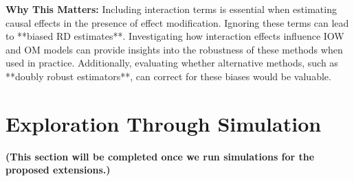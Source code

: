 \documentclass[12pt, oneside]{amsart}
\theoremstyle{definition}
\theoremstyle{remark}
\numberwithin{equation}{section}
\begin{document}
\textbf{Why This Matters:} Including interaction terms is essential when estimating causal effects in the presence of effect modification. Ignoring these terms can lead to **biased RD estimates**. Investigating how interaction effects influence IOW and OM models can provide insights into the robustness of these methods when used in practice. Additionally, evaluating whether alternative methods, such as **doubly robust estimators**, can correct for these biases would be valuable.

\section{Exploration Through Simulation}
\textbf{(This section will be completed once we run simulations for the proposed extensions.)}
\end{document}
